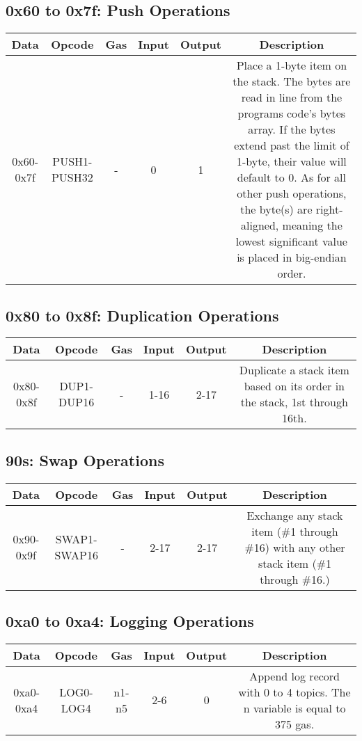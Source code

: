 \documentclass[10pt,a4paper,leqno,bibliography=totoc]{scrartcl}
\newenvironment{alphafootnotes}
{\par\edef\savedfootnotenumber{\number\value{footnote}}
\renewcommand{\thefootnote}{\alph{footnote}}
\setcounter{footnote}{0}}
{\par\setcounter{footnote}{\savedfootnotenumber}}
\begin{document}
\begin{alphafootnotes}
		\subsection{0x60 to 0x7f: Push Operations}
        \begin{longtable}{|cccccc|}
        \hline
        \textbf{Data} & \textbf{Opcode} & \textbf{Gas}  & \textbf{Input}  & \textbf{Output} & \textbf{Description} \\
        \hline
	0x60-0x7f & PUSH1-PUSH32 & - & 0 & 1 & Place a 1-byte item on the stack. The bytes are read in line from the programs code's bytes array. If the bytes extend past the limit of 1-byte, their value will default to 0. As for all other push operations, the byte(s) are right-aligned, meaning the lowest significant value is placed in big-endian order. \\
	\hline
	\end{longtable}

		\subsection{0x80 to 0x8f: Duplication Operations}
        \begin{longtable}{|cccccc|}
        \hline
        \textbf{Data} & \textbf{Opcode} & \textbf{Gas}  & \textbf{Input}  & \textbf{Output} & \textbf{Description} \\
        \hline
	0x80-0x8f & DUP1-DUP16 & - & 1-16 & 2-17 & Duplicate a stack item based on its order in the stack, 1st through 16th. \\
	\hline
	\end{longtable}
        \subsection{90s: Swap Operations}
        \begin{longtable}{|cccccc|}
        \hline  
        \textbf{Data} & \textbf{Opcode} & \textbf{Gas}  & \textbf{Input}  & \textbf{Output} & \textbf{Description} \\
        \hline  
	0x90-0x9f & SWAP1-SWAP16 & - & 2-17 & 2-17 & Exchange any stack item (\#1 through \#16) with any other stack item (\#1 through \#16.) \\
	\hline
	\end{longtable}

	\subsection{0xa0 to 0xa4: Logging Operations}
        \begin{longtable}{|cccccc|}
        \hline  
        \textbf{Data} & \textbf{Opcode} & \textbf{Gas}  & \textbf{Input}  & \textbf{Output} & \textbf{Description} \\
        \hline  
		0xa0-0xa4 & LOG0-LOG4 & n1-n5 & 2-6 & 0 & Append log record with 0 to 4 topics. The n variable is equal to 375 gas. \\
	\hline
	\end{longtable}


\end{alphafootnotes}
\end{document}
